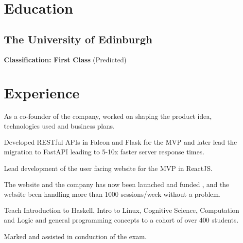 \documentclass{article}
\begin{document}
%
%
\begin{minipage}[t]{0.66\textwidth} 



\section{Education} 
\subsection{The University of Edinburgh}
\textbf{Classification: First Class} (Predicted)
\sectionsep


\section{Experience}
\vspace{\topsep} %
\begin{tightemize}
\item As a co-founder of the company, worked on shaping the product idea, technologies used and business plans.
\item Developed RESTful APIs in Falcon and Flask for the MVP and later lead the migration to FastAPI leading to 5-10x faster server response times.
\item Lead development of the user facing website for the MVP in ReactJS.
\item The website and the company has now been launched and funded , and the website been handling more than 1000 sessions/week without a problem.
\end{tightemize}
\sectionsep

\begin{tightemize}
\item Teach Introduction to Haskell, Intro to Linux, Cognitive Science, Computation and Logic and general programming concepts to a cohort of over 400 students.
\item Marked and assisted in conduction of the exam. 
\end{tightemize}
\sectionsep


\end{minipage}
\end{document}
